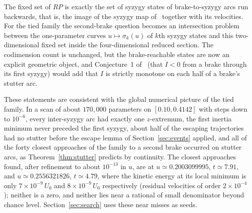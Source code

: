 The fixed set of $RP$ is exactly the set of syzygy states of brake-to-syzygy
arcs run backwards, that is, the image of the syzygy map of~\cite{MMV}
together with its velocities. For the tied family the second-brake question
becomes an intersection problem between the one-parameter curves
$u\mapsto\sigma_k(u)$ of $k$th syzygy states and this two-dimensional fixed
set inside the four-dimensional reduced section. The codimension count is
unchanged, but the brake-reachable states are now an explicit geometric
object, and Conjecture~1 of~\cite{MMV} (that $\dot I<0$ from a brake through
its first syzygy) would add that $I$ is strictly monotone on each half of a
brake's stutter arc.

These statements are consistent with the global numerical picture of the
tied family. In a scan of about $170{,}000$ parameters on $[0.10,0.4142]$
with steps down to $10^{-6}$, every inter-syzygy arc had exactly one
$z$-extremum, the first inertia minimum never preceded the first syzygy,
about half of the escaping trajectories had no stutter before the escape
lemma of Section~\ref{sec:events} applied, and all of the forty closest
approaches of the family to a second brake occurred on stutter arcs, as
Theorem~\ref{thm:stutter} predicts by continuity. The closest approaches found,
after refinement to about $10^{-13}$ in $u$, are at $u\simeq0.2003099995$,
$t\simeq7.91$, and $u\simeq0.2556321826$, $t\simeq4.79$, where the kinetic
energy at its local minimum is only $7\times10^{-9}\,U_0$ and
$8\times10^{-9}\,U_0$ respectively (residual velocities of order
$2\times10^{-4}$); neither is a zero, and neither lies near a rational of
small denominator beyond chance level. Section~\ref{sec:search}
uses these near misses as seeds.
